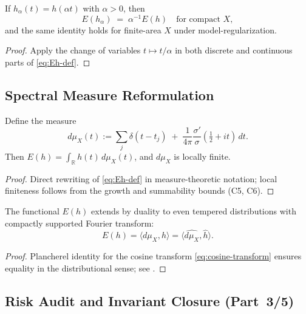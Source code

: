 \begin{proposition} \label{prop:Eh-scaling} %
If \(h_\alpha(t)=h(\alpha t)\) with \(\alpha>0\), then
\[
  E(h_\alpha)
  \;=\; \alpha^{-1}E(h)
  \quad\text{for compact } X,
\]
and the same identity holds for finite-area \(X\) under model-regularization. %
\end{proposition}

\begin{proof}
Apply the change of variables \(t\mapsto t/\alpha\) in both discrete and continuous parts of \eqref{eq:Eh-def}. %
\end{proof}

\subsection{Spectral Measure Reformulation} \label{subsec:measure-reformulation} \relax \hspace{0pt} %

\begin{proposition} \label{prop:measure-form} %
Define the measure
\[
  d\mu_X(t)
  := \sum_j \delta(t-t_j)
     \;+\; \frac{1}{4\pi}\frac{\sigma'}{\sigma}(\tfrac12+it)\,dt.
\]
Then \(E(h)=\int_{\mathbb R} h(t)\,d\mu_X(t)\), and \(d\mu_X\) is locally finite. %
\end{proposition}

\begin{proof}
Direct rewriting of \eqref{eq:Eh-def} in measure-theoretic notation; local finiteness follows from the growth and summability bounds (C5, C6). %
\end{proof}

\begin{lemma} \label{lem:distributional} %
The functional \(E(h)\) extends by duality to even tempered distributions with compactly supported Fourier transform:
\[
  E(h)=\langle d\mu_X, h\rangle = \langle \widehat{d\mu_X}, \widehat{h}\rangle.
\]
\end{lemma}

\begin{proof}
Plancherel identity for the cosine transform \eqref{eq:cosine-transform} ensures equality in the distributional sense; see \cite{HormanderI}. %
\end{proof}

\subsection{Risk Audit and Invariant Closure (Part~3/5)} \label{subsec:compliance-part3} %

